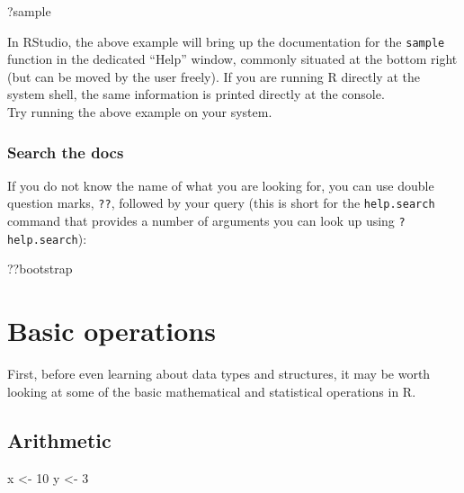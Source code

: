 \documentclass[
]{book}
\newenvironment{Shaded}{\begin{snugshade}}{\end{snugshade}}
\newcommand{\DecValTok}[1]{\textcolor[rgb]{0.00,0.00,0.81}{#1}}
\newcommand{\NormalTok}[1]{#1}
\newcommand{\OtherTok}[1]{\textcolor[rgb]{0.56,0.35,0.01}{#1}}
\begin{document}
\begin{Shaded}
\begin{Highlighting}[]
\NormalTok{?sample}
\end{Highlighting}
\end{Shaded}

In RStudio, the above example will bring up the documentation for the \texttt{sample} function in the dedicated ``Help'' window, commonly situated at the bottom right (but can be moved by the user freely). If you are running R directly at the system shell, the same information is printed directly at the console.\\
Try running the above example on your system.

\hypertarget{search-the-docs}{%
\subsection{Search the docs}\label{search-the-docs}}

If you do not know the name of what you are looking for, you can use double question marks, \texttt{??}, followed by your query (this is short for the \texttt{help.search} command that provides a number of arguments you can look up using \texttt{?help.search}):

\begin{Shaded}
\begin{Highlighting}[]
\NormalTok{??bootstrap}
\end{Highlighting}
\end{Shaded}

\hypertarget{basicops}{%
\chapter{Basic operations}\label{basicops}}

First, before even learning about data types and structures, it may be worth looking at some of the basic mathematical and statistical operations in R.

\hypertarget{arithmetic}{%
\section{Arithmetic}\label{arithmetic}}

\begin{Shaded}
\begin{Highlighting}[]
\NormalTok{x }\OtherTok{\textless{}{-}} \DecValTok{10}
\NormalTok{y }\OtherTok{\textless{}{-}} \DecValTok{3}
\end{Highlighting}
\end{Shaded}
\end{document}
